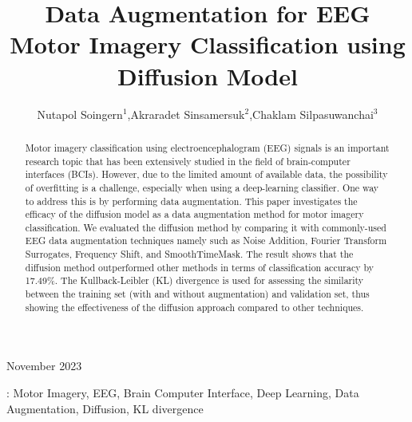 \documentclass[12pt]{iopart}
\begin{document}
\title[EEG Augmentation with Diffusion Model]{Data Augmentation for EEG Motor Imagery Classification using Diffusion Model}

\author{Nutapol Soingern$^1$,Akraradet Sinsamersuk$^2$,Chaklam Silpasuwanchai$^3$}

\address{Asian Institute of Technology, School of Engineering and Technology, Data Science and Artificial Intelligence, Pathum Thani, Thailand}
\vspace{10pt}
\begin{indented}
\item[]November 2023
\end{indented}

\begin{abstract}
Motor imagery classification using electroencephalogram (EEG) signals is an important research topic that has been extensively studied in the field of brain-computer interfaces (BCIs). 
However, due to the limited amount of available data, the possibility of overfitting is a challenge, especially when using a deep-learning classifier. 
One way to address this is by performing data augmentation. 
This paper investigates the efficacy of the diffusion model as a data augmentation method for motor imagery classification. 
We evaluated the diffusion method by comparing it with commonly-used EEG data augmentation techniques namely such as Noise Addition, Fourier Transform Surrogates, Frequency Shift, and SmoothTimeMask. 
The result shows that the diffusion method outperformed other methods in terms of classification accuracy by 17.49\%. 
The Kullback-Leibler (KL) divergence is used for assessing the similarity between the training set (with and without augmentation) and validation set, thus showing the effectiveness of the diffusion approach compared to other techniques.
\end{abstract}

%
\vspace{2pc}
: Motor Imagery, EEG, Brain Computer Interface, Deep Learning, Data Augmentation, Diffusion, KL divergence
%
%
%
% 
%
\end{document}
